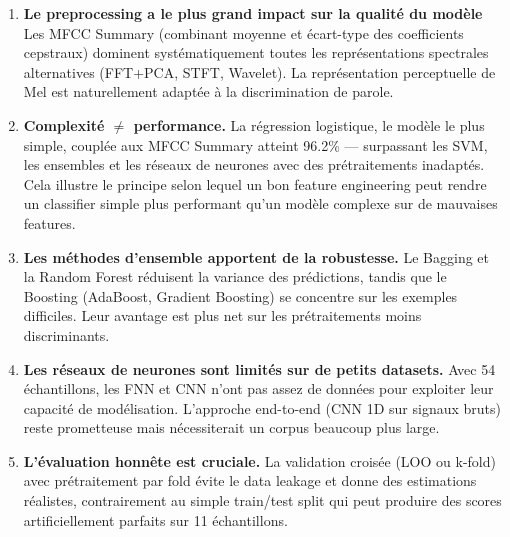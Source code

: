 \documentclass{name}
\begin{document}
\begin{enumerate}
    \item \textbf{Le preprocessing a le plus grand impact sur la qualité du modèle} Les MFCC Summary (combinant moyenne et écart-type des coefficients cepstraux) dominent systématiquement toutes les représentations spectrales alternatives (FFT+PCA, STFT, Wavelet). La représentation perceptuelle de Mel est naturellement adaptée à la discrimination de parole.
    
    \item \textbf{Complexité $\neq$ performance.} La régression logistique, le modèle le plus simple, couplée aux MFCC Summary atteint 96.2\% — surpassant les SVM, les ensembles et les réseaux de neurones avec des prétraitements inadaptés. Cela illustre le principe selon lequel un bon feature engineering peut rendre un classifier simple plus performant qu'un modèle complexe sur de mauvaises features.
    
    \item \textbf{Les méthodes d'ensemble apportent de la robustesse.} Le Bagging et la Random Forest réduisent la variance des prédictions, tandis que le Boosting (AdaBoost, Gradient Boosting) se concentre sur les exemples difficiles. Leur avantage est plus net sur les prétraitements moins discriminants.
    
    \item \textbf{Les réseaux de neurones sont limités sur de petits datasets.} Avec 54 échantillons, les FNN et CNN n'ont pas assez de données pour exploiter leur capacité de modélisation. L'approche end-to-end (CNN 1D sur signaux bruts) reste prometteuse mais nécessiterait un corpus beaucoup plus large.
    
    \item \textbf{L'évaluation honnête est cruciale.} La validation croisée (LOO ou k-fold) avec prétraitement par fold évite le data leakage et donne des estimations réalistes, contrairement au simple train/test split qui peut produire des scores artificiellement parfaits sur 11 échantillons.
\end{enumerate}
\end{document}
